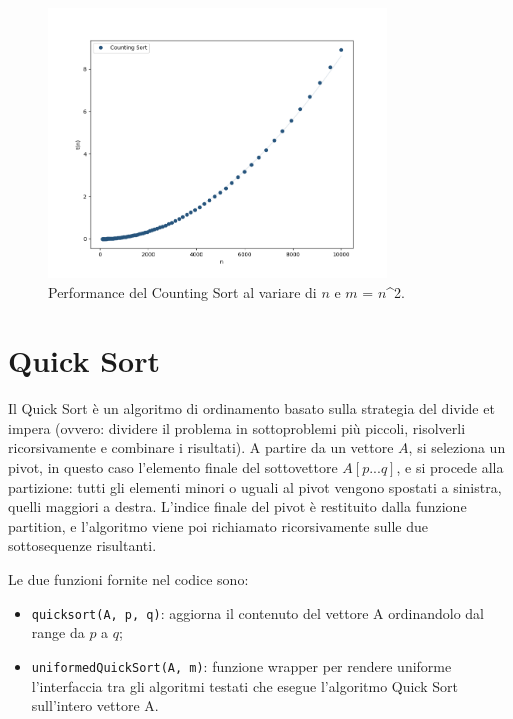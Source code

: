 \documentclass[a4paper, 12pt, oneside]{book}
\begin{document}
\begin{figure}[H]
    \centering
    \includegraphics[width=0.8\textwidth]{images/countingSortQuadratico.png}
    \caption{Performance del Counting Sort al variare di \(n\) e \(m\) = \(n\)^2.}
    \label{fig:counting_sort_m}
\end{figure}


\chapter{Quick Sort}\label{chap:Quick Sort} %

Il Quick Sort è un algoritmo di ordinamento basato sulla strategia del divide et impera (ovvero: dividere il problema in sottoproblemi più piccoli, risolverli ricorsivamente e combinare i risultati).
A partire da un vettore \(A\), si seleziona un pivot, in questo caso l'elemento finale del sottovettore \(A[p...q]\), e si procede alla partizione: tutti gli elementi minori o uguali al pivot vengono spostati a sinistra, quelli maggiori a destra. L'indice finale del pivot è restituito dalla funzione partition, e l'algoritmo viene poi richiamato ricorsivamente sulle due sottosequenze risultanti.


\noindent Le due funzioni fornite nel codice sono:

\begin{itemize}
    \item \texttt{quicksort(A, p, q)}: aggiorna il contenuto del vettore A ordinandolo dal range da $p$ a $q$;
    \item \texttt{uniformedQuickSort(A, m)}: funzione wrapper per rendere uniforme l'interfaccia tra gli algoritmi testati che esegue l'algoritmo Quick Sort sull'intero vettore A.
\end{itemize}
\end{document}
